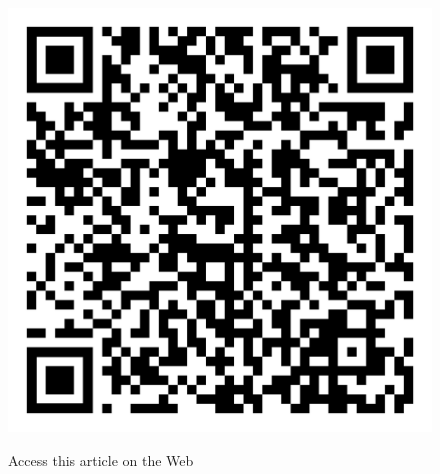 \vskip 1cm

\begin{figure}[H]
\centering
\includegraphics[scale=.15]{src/Figures/QR-codes/qr-code_characterization-of.png}

\medskip

{\large\sf Access this article on the Web}
\end{figure}
